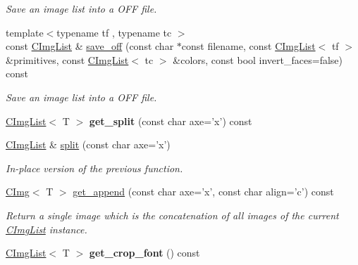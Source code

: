 \begin{DoxyCompactItemize}
\begin{DoxyCompactList}\small\item\em Save an image list into a O\-F\-F file. \end{DoxyCompactList}\item 
\hypertarget{structcimg__library_1_1_c_img_list_a710c45d62186109e4f36173cf1afbd7e}{{\footnotesize template$<$typename tf , typename tc $>$ }\\const \hyperlink{structcimg__library_1_1_c_img_list}{C\-Img\-List} \& \hyperlink{structcimg__library_1_1_c_img_list_a710c45d62186109e4f36173cf1afbd7e}{save\-\_\-off} (const char $\ast$const filename, const \hyperlink{structcimg__library_1_1_c_img_list}{C\-Img\-List}$<$ tf $>$ \&primitives, const \hyperlink{structcimg__library_1_1_c_img_list}{C\-Img\-List}$<$ tc $>$ \&colors, const bool invert\-\_\-faces=false) const }\label{structcimg__library_1_1_c_img_list_a710c45d62186109e4f36173cf1afbd7e}

\begin{DoxyCompactList}\small\item\em Save an image list into a O\-F\-F file. \end{DoxyCompactList}\item 
\hypertarget{structcimg__library_1_1_c_img_list_af3a28aca85c6fd45016316184be86419}{\hyperlink{structcimg__library_1_1_c_img_list}{C\-Img\-List}$<$ T $>$ {\bfseries get\-\_\-split} (const char axe='x') const }\label{structcimg__library_1_1_c_img_list_af3a28aca85c6fd45016316184be86419}

\item 
\hypertarget{structcimg__library_1_1_c_img_list_afc0f4fe0fdf9403dd0ff53ead01f38c4}{\hyperlink{structcimg__library_1_1_c_img_list}{C\-Img\-List} \& \hyperlink{structcimg__library_1_1_c_img_list_afc0f4fe0fdf9403dd0ff53ead01f38c4}{split} (const char axe='x')}\label{structcimg__library_1_1_c_img_list_afc0f4fe0fdf9403dd0ff53ead01f38c4}

\begin{DoxyCompactList}\small\item\em In-\/place version of the previous function. \end{DoxyCompactList}\item 
\hyperlink{structcimg__library_1_1_c_img}{C\-Img}$<$ T $>$ \hyperlink{structcimg__library_1_1_c_img_list_a2e328f768b98559b1d2b9706b1839b31}{get\-\_\-append} (const char axe='x', const char align='c') const 
\begin{DoxyCompactList}\small\item\em Return a single image which is the concatenation of all images of the current \hyperlink{structcimg__library_1_1_c_img_list}{C\-Img\-List} instance. \end{DoxyCompactList}\item 
\hypertarget{structcimg__library_1_1_c_img_list_a1431d38fb41eecbe1a49eb68cdf13037}{\hyperlink{structcimg__library_1_1_c_img_list}{C\-Img\-List}$<$ T $>$ {\bfseries get\-\_\-crop\-\_\-font} () const }\label{structcimg__library_1_1_c_img_list_a1431d38fb41eecbe1a49eb68cdf13037}


\end{DoxyCompactItemize}
